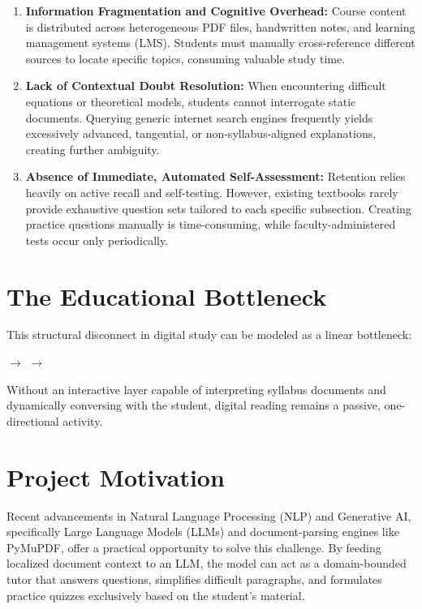 \documentclass[11pt,a4paper]{report}
\begin{document}
\begin{enumerate}[noitemsep, topsep=3pt]
    \item \textbf{Information Fragmentation and Cognitive Overhead:} Course content is distributed across heterogeneous PDF files, handwritten notes, and learning management systems (LMS). Students must manually cross-reference different sources to locate specific topics, consuming valuable study time.
    \item \textbf{Lack of Contextual Doubt Resolution:} When encountering difficult equations or theoretical models, students cannot interrogate static documents. Querying generic internet search engines frequently yields excessively advanced, tangential, or non-syllabus-aligned explanations, creating further ambiguity.
    \item \textbf{Absence of Immediate, Automated Self-Assessment:} Retention relies heavily on active recall and self-testing. However, existing textbooks rarely provide exhaustive question sets tailored to each specific subsection. Creating practice questions manually is time-consuming, while faculty-administered tests occur only periodically.
\end{enumerate}

\section{The Educational Bottleneck}
This structural disconnect in digital study can be modeled as a linear bottleneck:
\begin{center}
     $\longrightarrow$  $\longrightarrow$ 
\end{center}
Without an interactive layer capable of interpreting syllabus documents and dynamically conversing with the student, digital reading remains a passive, one-directional activity.

\section{Project Motivation}
Recent advancements in Natural Language Processing (NLP) and Generative AI, specifically Large Language Models (LLMs) and document-parsing engines like PyMuPDF, offer a practical opportunity to solve this challenge. By feeding localized document context to an LLM, the model can act as a domain-bounded tutor that answers questions, simplifies difficult paragraphs, and formulates practice quizzes exclusively based on the student's material. 
\end{document}
